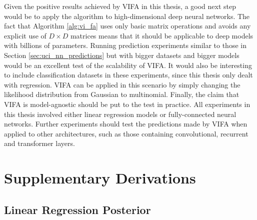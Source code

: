 \documentclass[msc,deptreport.inf]{infthesis} %
\begin{document}
Given the positive results achieved by VIFA in this thesis, a good next step would be to apply the algorithm to high-dimensional deep neural networks. The fact that Algorithm \ref{alg:vi_fa} uses only basic matrix operations and avoids any explicit use of $D \times D$ matrices means that it should be applicable to deep models with billions of parameters. Running prediction experiments similar to those in Section \ref{sec:uci_nn_predictions} but with bigger datasets and bigger models would be an excellent test of the scalability of VIFA. It would also be interesting to include classification datasets in these experiments, since this thesis only dealt with regression. VIFA can be applied in this scenario by simply changing the likelihood distribution from Gaussian to multinomial. Finally, the claim that VIFA is model-agnostic should be put to the test in practice. All experiments in this thesis involved either linear regression models or fully-connected neural networks. Further experiments should test the predictions made by VIFA when applied to other architectures, such as those containing convolutional, recurrent and transformer layers.





 \appendix
 
 \chapter{Supplementary Derivations}
 
 \section{Linear Regression Posterior}\label{app:bayesian_linear_regression_posterior}
 
\end{document}
